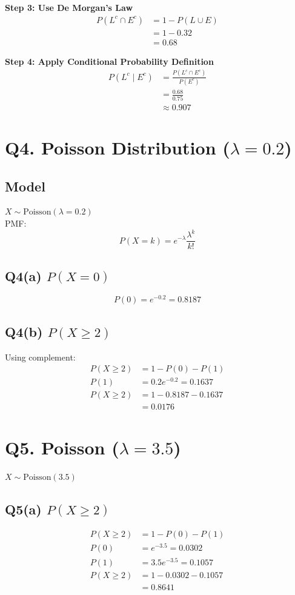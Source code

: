 \documentclass[11pt]{article}
\begin{document}
\textbf{Step 3: Use De Morgan’s Law}
\begin{align*}
    P(L^c \cap E^c) &= 1 - P(L \cup E) \\
    &= 1 - 0.32 \\
    &= 0.68
\end{align*}

\textbf{Step 4: Apply Conditional Probability Definition}
\begin{align*}
    P(L^c \mid E^c) &= \frac{P(L^c \cap E^c)}{P(E^c)} \\
    &= \frac{0.68}{0.75} \\
    &\approx 0.907
\end{align*}

\section{Q4. Poisson Distribution ($\lambda = 0.2$)}

\subsection{Model}
$X \sim \text{Poisson}(\lambda = 0.2)$ \\
PMF:
\[ P(X=k) = e^{-\lambda} \frac{\lambda^k}{k!} \]

\subsection{Q4(a) $P(X = 0)$}
\[ P(0) = e^{-0.2} = 0.8187 \]

\subsection{Q4(b) $P(X \ge 2)$}
Using complement:
\begin{align*}
    P(X \ge 2) &= 1 - P(0) - P(1) \\
    P(1) &= 0.2 e^{-0.2} = 0.1637 \\
    P(X \ge 2) &= 1 - 0.8187 - 0.1637 \\
    &= 0.0176
\end{align*}

\section{Q5. Poisson ($\lambda = 3.5$)}
$X \sim \text{Poisson}(3.5)$

\subsection{Q5(a) $P(X \ge 2)$}
\begin{align*}
    P(X \ge 2) &= 1 - P(0) - P(1) \\
    P(0) &= e^{-3.5} = 0.0302 \\
    P(1) &= 3.5e^{-3.5} = 0.1057 \\
    P(X \ge 2) &= 1 - 0.0302 - 0.1057 \\
    &= 0.8641
\end{align*}
\end{document}
